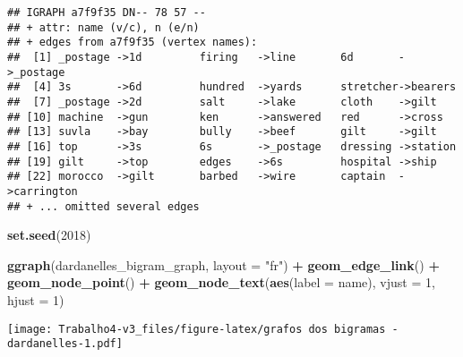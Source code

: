 \documentclass[]{article}
\newenvironment{Shaded}{\begin{snugshade}}{\end{snugshade}}
\newcommand{\DataTypeTok}[1]{\textcolor[rgb]{0.13,0.29,0.53}{#1}}
\newcommand{\DecValTok}[1]{\textcolor[rgb]{0.00,0.00,0.81}{#1}}
\newcommand{\KeywordTok}[1]{\textcolor[rgb]{0.13,0.29,0.53}{\textbf{#1}}}
\newcommand{\NormalTok}[1]{#1}
\newcommand{\OperatorTok}[1]{\textcolor[rgb]{0.81,0.36,0.00}{\textbf{#1}}}
\newcommand{\StringTok}[1]{\textcolor[rgb]{0.31,0.60,0.02}{#1}}
\begin{document}
\begin{verbatim}
## IGRAPH a7f9f35 DN-- 78 57 -- 
## + attr: name (v/c), n (e/n)
## + edges from a7f9f35 (vertex names):
##  [1] _postage ->1d         firing   ->line       6d       ->_postage  
##  [4] 3s       ->6d         hundred  ->yards      stretcher->bearers   
##  [7] _postage ->2d         salt     ->lake       cloth    ->gilt      
## [10] machine  ->gun        ken      ->answered   red      ->cross     
## [13] suvla    ->bay        bully    ->beef       gilt     ->gilt      
## [16] top      ->3s         6s       ->_postage   dressing ->station   
## [19] gilt     ->top        edges    ->6s         hospital ->ship      
## [22] morocco  ->gilt       barbed   ->wire       captain  ->carrington
## + ... omitted several edges
\end{verbatim}

\begin{Shaded}
\begin{Highlighting}[]
\KeywordTok{set.seed}\NormalTok{(}\DecValTok{2018}\NormalTok{)}

\KeywordTok{ggraph}\NormalTok{(dardanelles_bigram_graph, }\DataTypeTok{layout =} \StringTok{"fr"}\NormalTok{) }\OperatorTok{+}
\StringTok{  }\KeywordTok{geom_edge_link}\NormalTok{() }\OperatorTok{+}
\StringTok{  }\KeywordTok{geom_node_point}\NormalTok{() }\OperatorTok{+}
\StringTok{  }\KeywordTok{geom_node_text}\NormalTok{(}\KeywordTok{aes}\NormalTok{(}\DataTypeTok{label =}\NormalTok{ name), }\DataTypeTok{vjust =} \DecValTok{1}\NormalTok{, }\DataTypeTok{hjust =} \DecValTok{1}\NormalTok{)}
\end{Highlighting}
\end{Shaded}

\texttt{[image: Trabalho4-v3\_files/figure-latex/grafos dos bigramas - dardanelles-1.pdf]}
\end{document}
